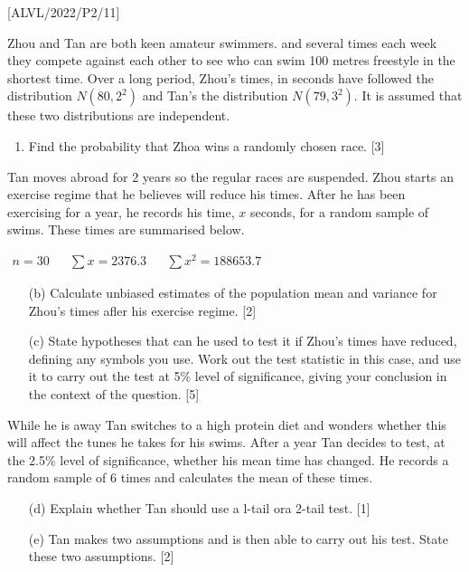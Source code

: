 \item {[}ALVL/2022/P2/11{]}

Zhou and Tan are both keen amateur swimmers. and several times each
week they compete against each other to see who can swim 100 metres
freestyle in the shortest time. Over a long period, Zhou's times,
in seconds have followed the distribution $N(80,2^{2})$ and Tan's
the distribution $N\left(79,3^{2}\right)$. It is assumed that these
two distributions are independent.
\begin{enumerate}
\item Find the probability that Zhoa wins a randomly chosen race. {[}3{]}
\end{enumerate}
Tan moves abroad for 2 years so the regular races are suspended. Zhou
starts an exercise regime that he believes will reduce his times.
After he has been exercising for a year, he records his time, $x$
seconds, for a random sample of swims. These times are summarised
below. 
\begin{center}
$\begin{array}{ccccc}
n=30 &  & \sum x=2376.3 &  & \sum x^{2}=188653.7\end{array}$
\par\end{center}
\begin{enumerate}
\item[(b)]  Calculate unbiased estimates of the population mean and variance
for Zhou's times afler his exercise regime. \hfill{}{[}2{]}
\item[(c)]  State hypotheses that can he used to test it if Zhou's times have
reduced, defining any symbols you use. Work out the test statistic
in this case, and use it to carry out the test at 5\% level of significance,
giving your conclusion in the context of the question. \hfill{}{[}5{]}
\end{enumerate}
While he is away Tan switches to a high protein diet and wonders whether
this will affect the tunes he takes for his swims. After a year Tan
decides to test, at the 2.5\% level of significance, whether his mean
time has changed. He records a random sample of 6 times and calculates
the mean of these times.
\begin{enumerate}
\item[(d)]  Explain whether Tan should use a l-tail ora 2-tail test.\hfill{}
{[}1{]}
\item[(e)]  Tan makes two assumptions and is then able to carry out his test.
State these two assumptions. \hfill{}{[}2{]}
\end{enumerate}
